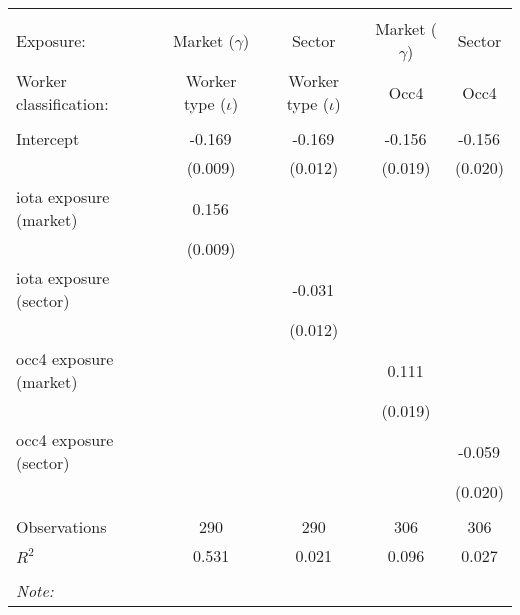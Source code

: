 \begin{tabular}{@{\extracolsep{5pt}}lcccc}
\\[-1.8ex]\hline
\hline \\[-1.8ex]
\hline \\[-1.8ex]
 Exposure: & Market ($\gamma$) & Sector & Market ($\gamma$) & Sector \\
 Worker classification: & Worker type ($\iota$) & Worker type ($\iota$) & Occ4 & Occ4 \\
 \hline &  &  &  &  \\
 Intercept & -0.169$^{}$ & -0.169$^{}$ & -0.156$^{}$ & -0.156$^{}$ \\
  & (0.009) & (0.012) & (0.019) & (0.020) \\
 iota exposure (market) & 0.156$^{}$ & & & \\
  & (0.009) & & & \\
 iota exposure (sector) & & -0.031$^{}$ & & \\
  & & (0.012) & & \\
 occ4 exposure (market) & & & 0.111$^{}$ & \\
  & & & (0.019) & \\
 occ4 exposure (sector) & & & & -0.059$^{}$ \\
  & & & & (0.020) \\
\hline \\[-1.8ex]
 Observations & 290 & 290 & 306 & 306 \\
 $R^2$ & 0.531 & 0.021 & 0.096 & 0.027 \\
\hline
\hline \\[-1.8ex]
\textit{Note:}\end{tabular}
